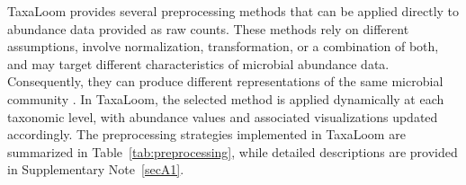 \documentclass[pdflatex,sn-vancouver-num]{sn-jnl}%
\theoremstyle{thmstyleone}%
\theoremstyle{thmstyletwo}%
\theoremstyle{thmstylethree}%
\begin{document}


TaxaLoom provides several preprocessing methods that can be applied directly to abundance data provided as raw counts. These methods rely on different assumptions, involve normalization, transformation, or a combination of both, and may target different characteristics of microbial abundance data. Consequently, they can produce different representations of the same microbial community \citep{weiss_normalization_2017,chen_gmpr_2018,llorens-rico_benchmarking_2021,nearing_microbiome_2022,wang_comparison_2024}. In TaxaLoom, the selected method is applied dynamically at each taxonomic level, with abundance values and associated visualizations updated accordingly. The preprocessing strategies implemented in TaxaLoom are summarized in Table~\ref{tab:preprocessing}, while detailed descriptions are provided in Supplementary Note~\ref{secA1}.
\end{document}
